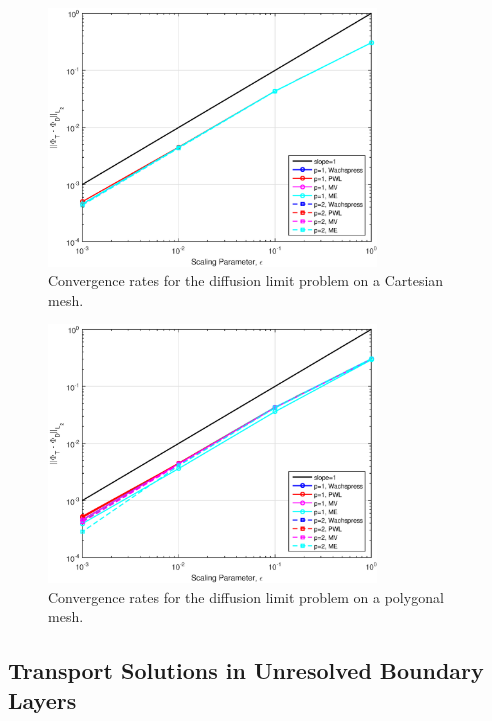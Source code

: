 \begin{figure}
\centering
\includegraphics[width=0.775\textwidth]{figures/sec_BF/DLConvergenceError_Cartesian.eps}
\caption{Convergence rates for the diffusion limit problem on a Cartesian mesh.}
\label{fig::BF_Results_DL_Conv_Cart}
\end{figure}

\begin{figure}
\centering
\includegraphics[width=0.775\textwidth]{figures/sec_BF/DLConvergenceError_SqPoly.eps}
\caption{Convergence rates for the diffusion limit problem on a polygonal mesh.}
\label{fig::BF_Results_DL_Conv_Poly}
\end{figure}

\subsection{Transport Solutions in Unresolved Boundary Layers}
\label{sec::DSA_Results_UBL}

